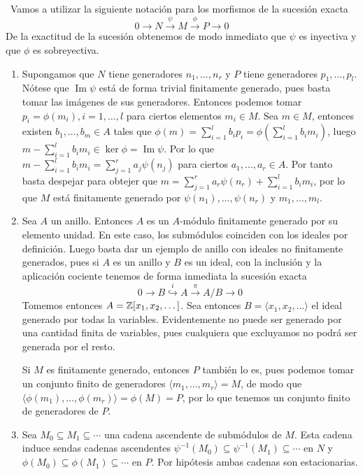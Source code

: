 \documentclass[twoside]{article}
\DeclareMathOperator{\Ima}{Im}
\begin{document}
\begin{solucion}\
Vamos a utilizar la siguiente notación para los morfismos de la sucesión exacta $$0\to N  \overset{\psi}{\to} M  \overset{\phi}{\to} P \to 0$$ De la exactitud de la sucesión obtenemos de modo inmediato que $\psi$ es inyectiva y que $\phi$ es sobreyectiva. 
\begin{enumerate}
\item Supongamos que $N$ tiene generadores $n_1,\dots, n_r$ y $P$ tiene generadores $p_1,\dots, p_l$. Nótese que $\Ima\psi$ está de forma trivial finitamente generado, pues basta tomar las imágenes de sus generadores. Entonces podemos tomar $p_i=\phi(m_i), i=1,\dots, l$ para ciertos elementos $m_i\in M$. Sea $m\in M$, entonces existen $b_1,\dots, b_m\in A$ tales que $\phi(m)=\sum_{i=1}^lb_ip_i=\phi\left(\sum_{i=1}^lb_im_i\right)$, luego $m-\sum_{i=1}^lb_im_i\in\ker\phi=\Ima\psi$. Por lo que $m-\sum_{i=1}^lb_im_i=\sum_{j=1}^r a_j\psi(n_j)$ para ciertos $a_1,\dots,a_r\in A$. Por tanto basta despejar para obtejer que $m=\sum_{j=1}^r a_r\psi(n_r)+\sum_{i=1}^lb_im_i$, por lo que $M$ está finitamente generado por $\psi(n_1),\dots, \psi(n_r)$ y $m_1,\dots, m_l$.

\item Sea $A$ un anillo. Entonces $A$ es un $A$-módulo finitamente generado por su elemento unidad. En este caso, los submódulos coinciden con los ideales por definición. Luego basta dar un ejemplo de anillo con ideales no finitamente generados, pues si $A$ es un anillo y $B$ es un ideal, con la inclusión y la aplicación cociente tenemos de forma inmediata la sucesión exacta
$$0\to B \overset{i}{\hookrightarrow} A\overset{\pi}{\to} A/B\to 0$$
Tomemos entonces $A=\mathbb{Z}[x_1,x_2,\dots]$. Sea entonces $B=\langle x_1,x_2,\dots  \rangle$ el ideal generado por todas la variables. Evidentemente no puede ser generado por una cantidad finita de variables, pues cualquiera que excluyamos no podrá ser generada por el resto. 

Si $M$ es finitamente generado, entonces $P$ también lo es, pues podemos tomar un conjunto finito de generadores $\langle m_1,\dots, m_r\rangle = M$, de modo que $\langle \phi(m_1),\dots, \phi(m_r)\rangle =\phi(M)=P$, por lo que tenemos un conjunto finito de generadores de $P$.

\item Sea $M_0\subseteq M_1\subseteq\cdots$ una cadena ascendente de submódulos de $M$. Esta cadena induce sendas cadenas ascendentes $\psi^{-1}(M_0)\subseteq\psi^{-1}(M_1)\subseteq\cdots$ en $N$ y $\phi(M_0)\subseteq\phi(M_1)\subseteq\cdots$ en $P$. Por hipótesis ambas cadenas son estacionarias. 


\end{enumerate}
\end{solucion}
\end{document}
